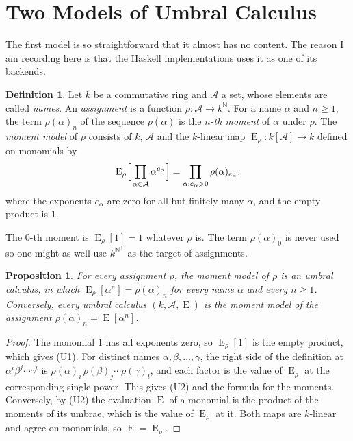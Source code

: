 \documentclass[11pt,a4paper]{report}
\theoremstyle{plain}
\newtheorem{proposition}[theorem]{Proposition}
\theoremstyle{definition}
\newtheorem{definition}[theorem]{Definition}
\theoremstyle{remark}
\newcommand{\E}{\operatorname{E}}
\newcommand{\NN}{\mathbb{N}}
\begin{document}
\section{Two Models of Umbral Calculus}
\label{sec:moment}

The first model is so straightforward that it almost has no content. The reason I am 
recording here is that the Haskell implementations uses it as one of its backends.

\begin{definition}
\label{def:moment}
Let $k$ be a commutative ring and $\mathcal{A}$ a set, whose elements are called
\emph{names}. An \emph{assignment} is a function
$\rho : \mathcal{A} \to k^{\NN}$. For a name $\alpha$ and $n \geq 1$, the term
$\rho(\alpha)_n$ of the sequence $\rho(\alpha)$ is the \emph{$n$-th moment} of
$\alpha$ under $\rho$. The \emph{moment model} of $\rho$ consists of $k$,
$\mathcal{A}$ and the $k$-linear map $\E_\rho : k[\mathcal{A}] \to k$ defined on
monomials by
\[
  \E_\rho\Bigl[\,\prod_{\alpha \in \mathcal{A}} \alpha^{e_\alpha}\Bigr]
    = \prod_{\alpha : e_\alpha > 0} \rho(\alpha)_{e_\alpha} ,
\]
where the exponents $e_\alpha$ are zero for all but finitely many $\alpha$, and the
empty product is $1$.
\end{definition}

The $0$-th moment is $\E_\rho[1] = 1$ whatever $\rho$ is.
The term $\rho(\alpha)_0$ is never used so one might as well use $k^{\NN^+}$ as the target of assignments. 


\begin{proposition}
\label{prop:moment}
For every assignment $\rho$, the moment model of $\rho$ is an umbral calculus, in
which $\E_\rho[\alpha^n] = \rho(\alpha)_n$ for every name $\alpha$ and every
$n \geq 1$. Conversely, every umbral calculus $(k, \mathcal{A}, \E)$ is the moment
model of the assignment $\rho(\alpha)_n = \E[\alpha^n]$.
\end{proposition}

\begin{proof}
The monomial $1$ has all exponents zero, so $\E_\rho[1]$ is the empty product,
which gives (U1). For distinct names $\alpha, \beta, \dots, \gamma$, the right
side of the definition at $\alpha^i\beta^j\cdots\gamma^l$ is
$\rho(\alpha)_i\,\rho(\beta)_j\cdots\rho(\gamma)_l$, and each factor is the value
of $\E_\rho$ at the corresponding single power. This gives (U2) and the formula
for the moments. Conversely, by (U2) the evaluation $\E$ of a monomial is the
product of the moments of its umbrae, which is the value of $\E_\rho$ at it. Both
maps are $k$-linear and agree on monomials, so $\E = \E_\rho$.
\end{proof}
\end{document}
